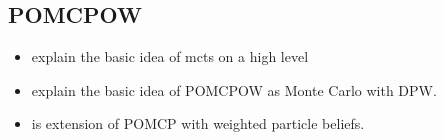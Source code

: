 
\subsection{POMCPOW}

\begin{itemize}
  \item explain the basic idea of \ac{mcts} on a high level
  \item explain the basic idea of POMCPOW as Monte Carlo with DPW.
  \item is extension of POMCP with weighted particle beliefs.
\end{itemize}



